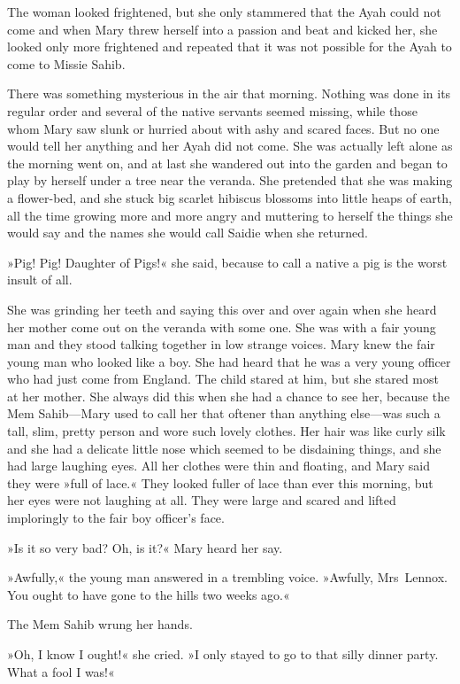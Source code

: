 The woman looked frightened, but she only stammered that the Ayah could not come and when Mary threw herself into a passion and beat and kicked her, she looked only more frightened and repeated that it was not possible for the Ayah to come to Missie Sahib.

There was something mysterious in the air that morning. Nothing was done in its regular order and several of the native servants seemed missing, while those whom Mary saw slunk or hurried about with ashy and scared faces. But no one would tell her anything and her Ayah did not come. She was actually left alone as the morning went on, and at last she wandered out into the garden and began to play by herself under a tree near the veranda. She pretended that she was making a flower-bed, and she stuck big scarlet hibiscus blossoms into little heaps of earth, all the time growing more and more angry and muttering to herself the things she would say and the names she would call Saidie when she returned.

»Pig! Pig! Daughter of Pigs!« she said, because to call a native a pig is the worst insult of all.

She was grinding her teeth and saying this over and over again when she heard her mother come out on the veranda with some one. She was with a fair young man and they stood talking together in low strange voices. Mary knew the fair young man who looked like a boy. She had heard that he was a very young officer who had just come from England. The child stared at him, but she stared most at her mother. She always did this when she had a chance to see her, because the Mem Sahib—Mary used to call her that oftener than anything else—was such a tall, slim, pretty person and wore such lovely clothes. Her hair was like curly silk and she had a delicate little nose which seemed to be disdaining things, and she had large laughing eyes. All her clothes were thin and floating, and Mary said they were »full of lace.« They looked fuller of lace than ever this morning, but her eyes were not laughing at all. They were large and scared and lifted imploringly to the fair boy officer's face.

»Is it so very bad? Oh, is it?« Mary heard her say.

»Awfully,« the young man answered in a trembling voice. »Awfully, Mrs~Lennox. You ought to have gone to the hills two weeks ago.«

The Mem Sahib wrung her hands.

»Oh, I know I ought!« she cried. »I only stayed to go to that silly dinner party. What a fool I was!«


